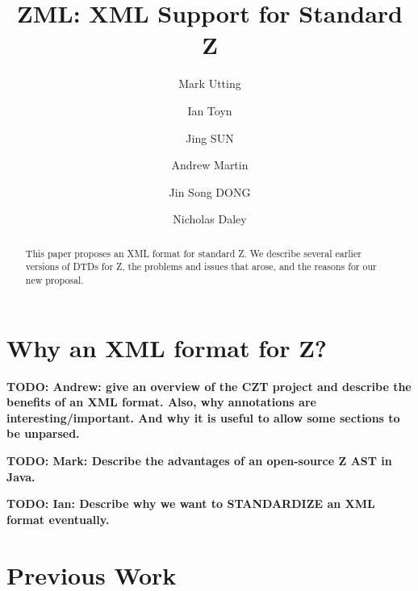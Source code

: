 
\newcommand{\TODO}[1]{\textbf{TODO: #1}}   %

\title{ZML: XML Support for Standard Z}
\author{Mark Utting 
        \and Ian Toyn
        \and Jing SUN
        \and Andrew Martin   %
        \and Jin Song DONG
        \and Nicholas Daley
}


\maketitle

\begin{abstract}
  This paper proposes an XML format for standard Z.
  We describe several earlier versions of DTDs for Z,
  the problems and issues that arose, and the reasons
  for our new proposal.
\end{abstract}

\section{Why an XML format for Z?}

  \TODO{Andrew: give an overview of the CZT project and describe the benefits
        of an XML format.  Also, why annotations are interesting/important.
        And why it is useful to allow some sections to be unparsed.}

  \TODO{Mark: Describe the advantages of an open-source Z AST in Java.}

  \TODO{Ian: Describe why we want to STANDARDIZE an XML format eventually.}

\section{Previous Work}

